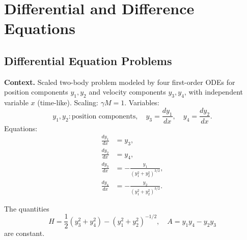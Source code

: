 \chapter{Differential and Difference Equations}

\section{Differential Equation Problems}

\noindent\textbf{Context.}
Scaled two-body problem modeled by four first-order ODEs for position components \(y_1, y_2\) and velocity components \(y_3, y_4\), with independent variable \(x\) (time-like). Scaling: \(\gamma M = 1\). Variables:
\[
y_1, y_2: \text{position components}, \quad 
y_3 = \frac{dy_1}{dx}, \quad 
y_4 = \frac{dy_2}{dx}.
\]
Equations:
\begin{align}
\frac{dy_1}{dx} &= y_3, \label{101a}\\
\frac{dy_2}{dx} &= y_4, \label{101b}\\
\frac{dy_3}{dx} &= -\frac{y_1}{(y_1^2 + y_2^2)^{3/2}}, \label{101c}\\
\frac{dy_4}{dx} &= -\frac{y_2}{(y_1^2 + y_2^2)^{3/2}}. \label{101d}
\end{align}

\begin{theorem}

  \label{thm:101A}
  \uses{}
The quantities
\[
H = \frac{1}{2} \left( y_3^2 + y_4^2 \right) - \left( y_1^2 + y_2^2 \right)^{-1/2}, \quad A = y_1 y_4 - y_2 y_3
\]
are constant.
\end{theorem}

